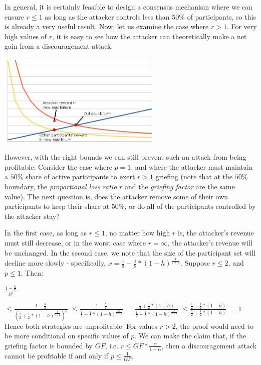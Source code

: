 \documentclass[12pt]{article}
\begin{document}
In general, it is certainly feasible to design a consensus mechanism where we can ensure $r \le 1$ as long as the attacker controls less than $50\%$ of participants, so this is already a very useful result. Now, let us examine the case where $r > 1$. For very high values of $r$, it is easy to see how the attacker can theoretically make a net gain from a discouragement attack:

\includegraphics[width=300px]{disc_chart3.png}



However, with the right bounds we can still prevent such an attack from being profitable. Consider the case where $p=1$, and where the attacker must maintain a $50\%$ share of active participants to exert $r > 1$ griefing (note that at the $50\%$ boundary, the \textit{proportional loss ratio} $r$ and the \textit{griefing factor} are the same value). The next question is, does the attacker remove some of their own participants to keep their share at $50\%$, or do all of the participants controlled by the attacker stay?

In the first case, as long as $r \le 1$, no matter how high $r$ is, the attacker's revenue must still decrease, or in the worst case where $r = \infty$, the attacker's revenue will be unchanged. In the second case, we note that the size of the participant set will decline more slowly - specifically, $x = \frac{1}{2} + \frac{1}{2} * (1-h)^{\frac{1}{d+p}}$. Suppose $r \le 2$, and $p \le 1$. Then:

$\frac{1-\frac{h}{r}}{x^p}$


$ \le \frac{1-\frac{h}{2}}{(\frac{1}{2} + \frac{1}{2} * (1-h)^{\frac{1}{d+p}})^p}$
$ \le \frac{1-\frac{h}{2}}{\frac{1}{2} + \frac{1}{2} * (1-h)^{\frac{p}{d+p}}}$
$ = \frac{\frac{1}{2} + \frac{1}{2} * (1-h)}{\frac{1}{2} + \frac{1}{2} * (1-h)^{\frac{p}{d+p}}}$
$ \le \frac{\frac{1}{2} + \frac{1}{2} * (1-h)}{\frac{1}{2} + \frac{1}{2} * (1-h)}$
$ = 1$
Hence both strategies are unprofitable. For values $r > 2$, the proof would need to be more conditional on specific values of $p$. We can make the claim that, if the griefing factor is bounded by $GF$, i.e. $r \le GF * \frac{\alpha}{1-\alpha}$, then a discouragement attack cannot be profitable if and only if $p \le \frac{1}{GF}$.
\end{document}
